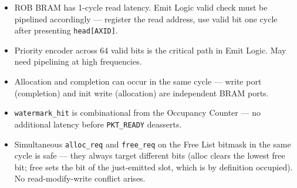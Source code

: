 \documentclass[11pt]{article}
\begin{document}
\begin{itemize}[noitemsep]
  \item ROB BRAM has 1-cycle read latency. Emit Logic valid check must be pipelined accordingly — register the read address, use valid bit one cycle after presenting \texttt{head[AXID]}.
  \item Priority encoder across 64 valid bits is the critical path in Emit Logic. May need pipelining at high frequencies.
  \item Allocation and completion can occur in the same cycle — write port (completion) and init write (allocation) are independent BRAM ports.
  \item \texttt{watermark\_hit} is combinational from the Occupancy Counter — no additional
        latency before \texttt{PKT\_READY} deasserts.
  \item Simultaneous \texttt{alloc\_req} and \texttt{free\_req} on the Free List bitmask in
        the same cycle is safe — they always target different bits (alloc clears the lowest
        free bit; free sets the bit of the just-emitted slot, which is by definition occupied).
        No read-modify-write conflict arises.
\end{itemize}
\end{document}
